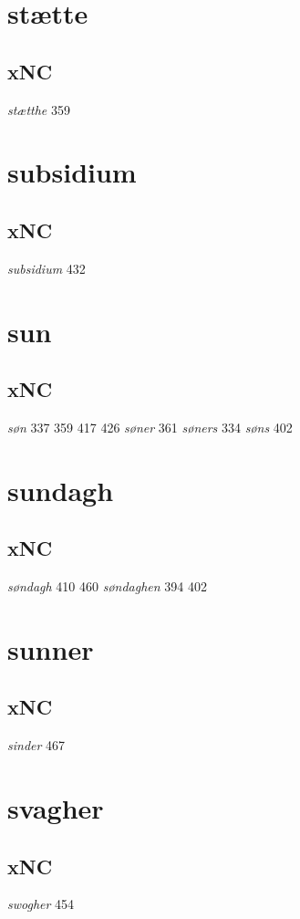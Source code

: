 \documentclass[a4paper,twocolumn]{article}
\begin{document}
\section{stætte}
\label{sec:orga6666bb}
\subsection{xNC}
\label{sec:orgaf320e1}
\emph{stætthe} 359 
\section{subsidium}
\label{sec:orgbf1c14a}
\subsection{xNC}
\label{sec:orgec6c699}
\emph{subsidium} 432 
\section{sun}
\label{sec:org6f77bb1}
\subsection{xNC}
\label{sec:orgbddfab8}
\emph{søn} 337 359 417 426 \emph{søner} 361 \emph{søners} 334 \emph{søns} 402 
\section{sundagh}
\label{sec:org6477c8f}
\subsection{xNC}
\label{sec:org5d3314b}
\emph{søndagh} 410 460 \emph{søndaghen} 394 402 
\section{sunner}
\label{sec:orgf516823}
\subsection{xNC}
\label{sec:orga7053f8}
\emph{sinder} 467 
\section{svagher}
\label{sec:orgd0fbcbc}
\subsection{xNC}
\label{sec:orgf36dcfe}
\emph{swogher} 454 
\end{document}
